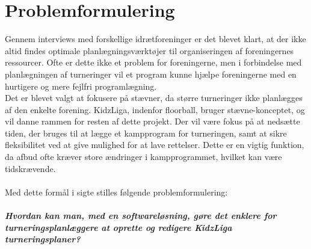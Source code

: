 \chapter{Problemformulering}\label{ch:chlabel}
Gennem interviews med forskellige idrætforeninger er det blevet klart, at der ikke altid findes optimale planlægningsværktøjer til organiseringen af foreningernes ressourcer. Ofte er dette ikke et problem for foreningerne, men i forbindelse med planlægningen af turneringer vil et program kunne hjælpe foreningerne med en hurtigere og mere fejlfri programlægning. \\
Det er blevet valgt at fokusere på stævner, da større turneringer ikke planlægges af den enkelte forening. KidzLiga, indenfor floorball, bruger stævne-konceptet, og vil danne rammen for resten af dette projekt. Der vil være fokus på at nedsætte tiden, der bruges til at lægge et kampprogram for turneringen, samt at sikre fleksibilitet ved at give mulighed for at lave rettelser. Dette er en vigtig funktion, da afbud ofte kræver store ændringer i kampprogrammet, hvilket kan være tidskrævende.
\\\\
Med dette formål i sigte stilles følgende problemformulering:
\paragraph{Hvordan kan man, med en softwareløsning, gøre det enklere for turneringsplanlæggere at oprette og redigere KidzLiga turneringsplaner?}

